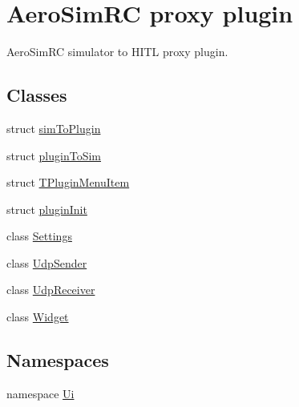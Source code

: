 \hypertarget{group___aero_sim_r_c}{\section{\-Aero\-Sim\-R\-C proxy plugin}
\label{group___aero_sim_r_c}
}


\-Aero\-Sim\-R\-C simulator to \-H\-I\-T\-L proxy plugin.  


\subsection*{\-Classes}
\begin{DoxyCompactItemize}
\item 
struct \hyperlink{structsim_to_plugin}{sim\-To\-Plugin}
\item 
struct \hyperlink{structplugin_to_sim}{plugin\-To\-Sim}
\item 
struct \hyperlink{struct_t_plugin_menu_item}{\-T\-Plugin\-Menu\-Item}
\item 
struct \hyperlink{structplugin_init}{plugin\-Init}
\item 
class \hyperlink{class_settings}{\-Settings}
\item 
class \hyperlink{class_udp_sender}{\-Udp\-Sender}
\item 
class \hyperlink{class_udp_receiver}{\-Udp\-Receiver}
\item 
class \hyperlink{class_widget}{\-Widget}
\end{DoxyCompactItemize}
\subsection*{\-Namespaces}
\begin{DoxyCompactItemize}
\item 
namespace \hyperlink{namespace_ui}{\-Ui}
\end{DoxyCompactItemize}
